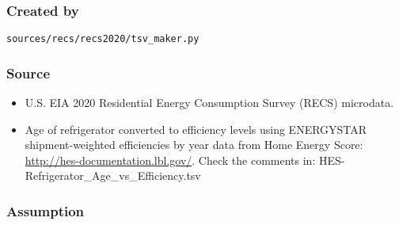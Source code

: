\subsubsection{Created by}\label{created-by-135}

\texttt{sources/recs/recs2020/tsv\_maker.py}

\subsubsection{Source}\label{source-137}

\begin{itemize}
 
\item
  U.S. EIA 2020 Residential Energy Consumption Survey (RECS) microdata.
\item
  Age of refrigerator converted to efficiency levels using ENERGYSTAR
  shipment-weighted efficiencies by year data from Home Energy Score:
  \url{http://hes-documentation.lbl.gov/}. Check the comments in:
  HES-Refrigerator\_Age\_vs\_Efficiency.tsv
\end{itemize}

\subsubsection{Assumption}\label{assumption-77}

